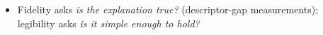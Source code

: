 \begin{itemize}
    \item Fidelity asks \emph{is the explanation true?} (descriptor-gap measurements); legibility asks \emph{is it simple enough to hold?} 

\end{itemize}
